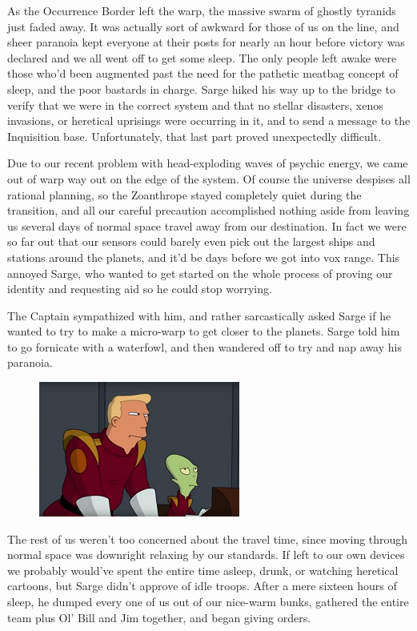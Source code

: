 As the Occurrence Border left the warp, the massive swarm of ghostly tyranids just faded away. 
It was actually sort of awkward for those of us on the line, and sheer paranoia kept everyone at their posts for nearly an hour before victory was declared and we all went off to get some sleep. 
The only people left awake were those who'd been augmented past the need for the pathetic meatbag concept of sleep, and the poor bastards in charge. 
Sarge hiked his way up to the bridge to verify that we were in the correct system and that no stellar disasters, xenos invasions, or heretical uprisings were occurring in it, and to send a message to the Inquisition base. 
Unfortunately, that last part proved unexpectedly difficult.

Due to our recent problem with head-exploding waves of psychic energy, we came out of warp way out on the edge of the system. 
Of course the universe despises all rational planning, so the Zoanthrope stayed completely quiet during the transition, and all our careful precaution accomplished nothing aside from leaving us several days of normal space travel away from our destination. 
In fact we were so far out that our sensors could barely even pick out the largest ships and stations around the planets, and it'd be days before we got into vox range. 
This annoyed Sarge, who wanted to get started on the whole process of proving our identity and requesting aid so he could stop worrying. 


The Captain sympathized with him, and rather sarcastically asked Sarge if he wanted to try to make a micro-warp to get closer to the planets. 
Sarge told him to go fornicate with a waterfowl, and then wandered off to try and nap away his paranoia.

\begin{figure}
	\begin{center}
		\includegraphics[width=\figwidth]{pics/15/21.png}
	\end{center}
\end{figure}
The rest of us weren't too concerned about the travel time, since moving through normal space was downright relaxing by our standards. 
If left to our own devices we probably would've spent the entire time asleep, drunk, or watching heretical cartoons, but Sarge didn't approve of idle troops. 
After a mere sixteen hours of sleep, he dumped every one of us out of our nice-warm bunks, gathered the entire team plus Ol' Bill and Jim together, and began giving orders.

